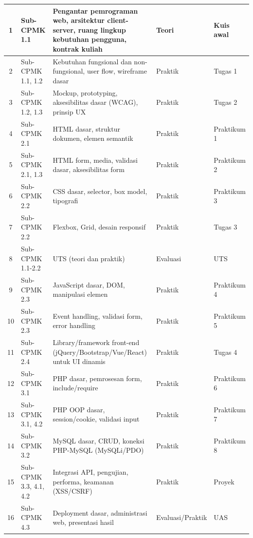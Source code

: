 \documentclass[12pt,a4paper]{article}
\begin{document}
\begin{longtable}{|c|>{\raggedright\arraybackslash}p{3cm}|>{\raggedright\arraybackslash}p{6.2cm}|>{\raggedright\arraybackslash}p{2.2cm}|>{\raggedright\arraybackslash}p{2.2cm}|}
1 & Sub-CPMK 1.1 & Pengantar pemrograman web, arsitektur client-server, ruang lingkup kebutuhan pengguna, kontrak kuliah & Teori & Kuis awal \\
\hline
2 & Sub-CPMK 1.1, 1.2 & Kebutuhan fungsional dan non-fungsional, user flow, wireframe dasar & Praktik & Tugas 1 \\
\hline
3 & Sub-CPMK 1.2, 1.3 & Mockup, prototyping, aksesibilitas dasar (WCAG), prinsip UX & Praktik & Tugas 2 \\
\hline
4 & Sub-CPMK 2.1 & HTML dasar, struktur dokumen, elemen semantik & Praktik & Praktikum 1 \\
\hline
5 & Sub-CPMK 2.1, 1.3 & HTML form, media, validasi dasar, aksesibilitas form & Praktik & Praktikum 2 \\
\hline
6 & Sub-CPMK 2.2 & CSS dasar, selector, box model, tipografi & Praktik & Praktikum 3 \\
\hline
7 & Sub-CPMK 2.2 & Flexbox, Grid, desain responsif & Praktik & Tugas 3 \\
\hline
8 & Sub-CPMK 1.1-2.2 & UTS (teori dan praktik) & Evaluasi & UTS \\
\hline
9 & Sub-CPMK 2.3 & JavaScript dasar, DOM, manipulasi elemen & Praktik & Praktikum 4 \\
\hline
10 & Sub-CPMK 2.3 & Event handling, validasi form, error handling & Praktik & Praktikum 5 \\
\hline
11 & Sub-CPMK 2.4 & Library/framework front-end (jQuery/Bootstrap/Vue/React) untuk UI dinamis & Praktik & Tugas 4 \\
\hline
12 & Sub-CPMK 3.1 & PHP dasar, pemrosesan form, include/require & Praktik & Praktikum 6 \\
\hline
13 & Sub-CPMK 3.1, 4.2 & PHP OOP dasar, session/cookie, validasi input & Praktik & Praktikum 7 \\
\hline
14 & Sub-CPMK 3.2 & MySQL dasar, CRUD, koneksi PHP-MySQL (MySQLi/PDO) & Praktik & Praktikum 8 \\
\hline
15 & Sub-CPMK 3.3, 4.1, 4.2 & Integrasi API, pengujian, performa, keamanan (XSS/CSRF) & Praktik & Proyek \\
\hline
16 & Sub-CPMK 4.3 & Deployment dasar, administrasi web, presentasi hasil & Evaluasi/Praktik & UAS \\
\hline
\end{longtable}

\vspace{0.5cm}

\end{document}
